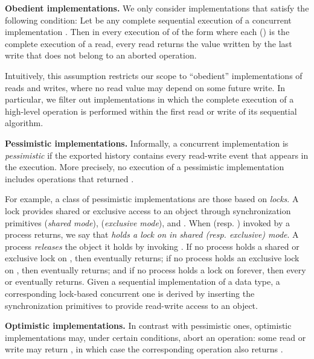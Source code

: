 \documentclass[11pt,pdftex,letterpaper]{article}
\begin{document}
\vspace{1mm}\noindent\textbf{Obedient implementations.}
We only consider implementations that satisfy the following condition:
Let  be any complete sequential execution of a concurrent implementation .
Then in every execution of  of the form 
where each  () is the complete execution of a
read, every read returns the value written by the last write that does
not belong to an aborted operation.

Intuitively, this assumption restricts our scope to
``obedient'' implementations of reads and writes, where no
read value may depend on some future write.   
In particular, we filter out implementations in which the
complete execution of a high-level operation is performed within the
first read or write of its sequential algorithm.

\vspace{1mm}\noindent\textbf{Pessimistic implementations.}
Informally, a concurrent implementation is \emph{pessimistic} if the exported history contains
every read-write event that appears in the execution. 
More precisely, no execution of a pessimistic implementation includes
operations that returned .  

For example, a class of pessimistic implementations are those based on \emph{locks}.
A lock provides
shared or exclusive access to an object  through 
synchronization primitives  (\emph{shared mode}),
 (\emph{exclusive mode}),  
and .
When  (resp. ) invoked
by a process  returns, we say that  \emph{holds
a lock on  in shared (resp. exclusive) mode}.
A process \emph{releases} the object it holds by invoking
.  
If no process holds a shared or exclusive
lock on , then 
eventually returns;
if no process holds an exclusive
lock on , then 
eventually returns; and
if no process holds a
lock on  forever, then every  or 
eventually returns. 
Given a sequential implementation of a data type, 
a corresponding lock-based concurrent one 
is derived by inserting the synchronization primitives
to provide read-write access to an object. 

\vspace{1mm}\noindent\textbf{Optimistic implementations.}
In contrast with pessimistic ones, optimistic implementations may, under
certain conditions, abort an operation:
some read or write may return ,
in which case the corresponding operation also returns .
\end{document}
